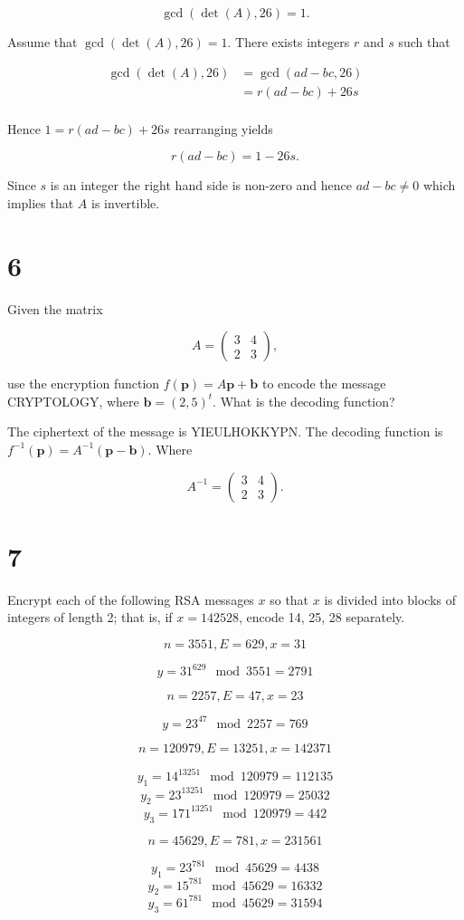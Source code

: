 \documentclass[a4paper]{article}
\begin{document}
$$\gcd(\det(A), 26) = 1.$$

Assume that $\gcd(\det(A), 26) = 1$. There exists integers $r$ and $s$ such that

\begin{align*}
\gcd(\det(A), 26) &= \gcd(ad - bc, 26) \\
&= r(ad-bc) + 26s \\
\end{align*}

Hence $1 = r(ad-bc) + 26s$ rearranging yields

$$r(ad - bc) = 1 - 26s.$$

Since $s$ is an integer the right hand side is non-zero and hence $ad - bc \neq 0$ which implies that $A$ is invertible.


\section*{6}

Given the matrix

$$A = \begin{pmatrix}
3 & 4 \\
2 & 3
\end{pmatrix},$$

use the encryption function $f(\mathbf{p}) = A \mathbf{p} + \mathbf{b}$ to encode the message CRYPTOLOGY, where $\mathbf{b} = (2,5)^t$. What is the decoding function?

\vspace{\baselineskip}

The ciphertext of the message is YIEULHOKKYPN. The decoding function is $f^{-1}(\mathbf{p}) = A^{-1} (\mathbf{p} - \mathbf{b})$. Where 

$$A^{-1} = \begin{pmatrix}
3 & 4 \\
2 & 3
\end{pmatrix}.$$


\section*{7}

Encrypt each of the following RSA messages $x$ so that $x$ is divided into blocks of integers of length 2; that is, if $x = 142528$, encode 14, 25, 28 separately.

$$n=3551, E=629, x=31$$

$$y = 31^{629} \mod 3551 = 2791$$

$$n=2257, E=47, x=23$$

$$y = 23^{47} \mod 2257 = 769$$


$$n=120979, E=13251, x=142371$$

$$y_1= 14^{13251} \mod 120979 = 112135$$
$$y_2= 23^{13251} \mod 120979 = 25032$$
$$y_3= 171^{13251} \mod 120979 = 442$$

$$n=45629, E=781, x=231561$$

$$y_1 = 23^{781} \mod 45629 = 4438$$
$$y_2 = 15^{781} \mod 45629 = 16332$$
$$y_3 = 61^{781} \mod 45629 = 31594$$
\end{document}
